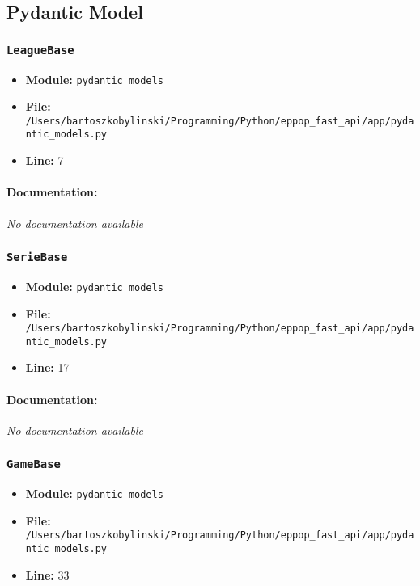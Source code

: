 \documentclass[11pt,a4paper]{article}
\begin{document}
\vspace{1em}
\subsection{Pydantic Model}

\subsubsection{\texttt{LeagueBase}}

\begin{itemize}
    \item \textbf{Module:} \texttt{pydantic\_models}
    \item \textbf{File:} \texttt{/Users/bartoszkobylinski/Programming/Python/eppop\_fast\_api/app/pydantic\_models.py}
    \item \textbf{Line:} 7
\end{itemize}

\paragraph{Documentation:} \textit{No documentation available}


\vspace{1em}
\subsubsection{\texttt{SerieBase}}

\begin{itemize}
    \item \textbf{Module:} \texttt{pydantic\_models}
    \item \textbf{File:} \texttt{/Users/bartoszkobylinski/Programming/Python/eppop\_fast\_api/app/pydantic\_models.py}
    \item \textbf{Line:} 17
\end{itemize}

\paragraph{Documentation:} \textit{No documentation available}


\vspace{1em}
\subsubsection{\texttt{GameBase}}

\begin{itemize}
    \item \textbf{Module:} \texttt{pydantic\_models}
    \item \textbf{File:} \texttt{/Users/bartoszkobylinski/Programming/Python/eppop\_fast\_api/app/pydantic\_models.py}
    \item \textbf{Line:} 33
\end{itemize}
\end{document}
